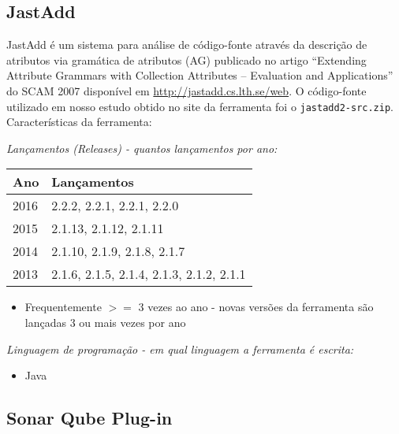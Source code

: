 \subsection{JastAdd}

JastAdd é um sistema para análise de código-fonte através da descrição de
atributos via gramática de atributos (AG) publicado no artigo ``Extending
Attribute Grammars with Collection Attributes -- Evaluation and Applications''
do SCAM 2007 disponível em \url{http://jastadd.cs.lth.se/web}. O código-fonte
utilizado em nosso estudo obtido no site da ferramenta foi o
\texttt{jastadd2-src.zip}. Características da ferramenta:

\begin{description}

  \item {\it Lançamentos ({\it Releases}) - quantos lançamentos por ano:}
    \begin{table}[h!]
      \centering
      \begin{tabular}{| l | l |}
        \hline
        Ano  & Lançamentos                              \\
        \hline
        2016 & 2.2.2, 2.2.1, 2.2.1, 2.2.0               \\
        2015 & 2.1.13, 2.1.12, 2.1.11                   \\
        2014 & 2.1.10, 2.1.9, 2.1.8, 2.1.7              \\
        2013 & 2.1.6, 2.1.5, 2.1.4, 2.1.3, 2.1.2, 2.1.1 \\
        \hline
      \end{tabular}
    \end{table}
    \begin{itemize}
      \item Frequentemente $>=$ 3 vezes ao ano - novas versões da ferramenta são lançadas 3 ou mais vezes por ano
    \end{itemize}

  \item {\it Linguagem de programação - em qual linguagem a ferramenta é escrita:}
    \begin{itemize}
      \item Java
    \end{itemize}

\end{description}

\subsection{Sonar Qube Plug-in}

